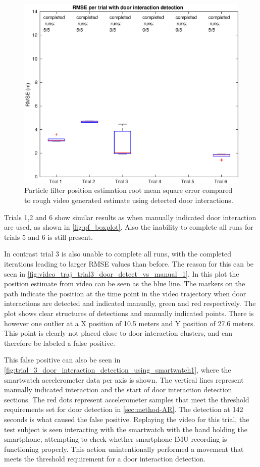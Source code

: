 \begin{figure}[H]
	\centering
	\includegraphics[width=0.7\linewidth]{images/20201201_1851_RMSE_per_trial_with_door_interaction_detection}
	\caption[Particle Filter position estimation performance with door interaction]{Particle filter position estimation root mean square error compared to rough video generated estimate using detected door interactions.}
	\label{fig:rmse_per_trial_with_activity_recognition}
\end{figure}

Trials 1,2 and 6 show similar results as when manually indicated door interaction are used, as shown in \cref{fig:pf_boxplot}. Also the inability to complete all runs for trials 5 and 6 is still present. \par 

In contrast trial 3 is also unable to complete all runs, with the completed iterations leading to larger RMSE values than before. The reason for this can be seen in \cref{fig:video_traj_trial3_door_detect_vs_manual_1}. In this plot the position estimate from video can be seen as the blue line. The markers on the path indicate the position at the time point in the video trajectory when door interactions are detected and indicated manually, green and red respectively. The plot shows clear structures of detections and manually indicated points. There is however one outlier at a X position of 10.5 meters and Y position of 27.6 meters. This point is clearly not placed close to door interaction clusters, and can therefore be labeled a false positive. \par 

This false positive can also be seen in \cref{fig:trial_3_door_interaction_detection_using_smartwatch1}, where the smartwatch accelerometer data per axis is shown. The vertical lines represent manually indicated interaction and the start of door interaction detection sections. The red dots represent accelerometer samples that meet the threshold requirements set for door detection in \cref{sec:method-AR}. The detection at 142 seconds is what caused the false positive. Replaying the video for this trial, the test subject is seen interacting with the smartwatch with the hand holding the smartphone, attempting to check whether smartphone IMU recording is functioning properly. This action unintentionally performed a movement that meets the threshold requirement for a door interaction detection. \par 

